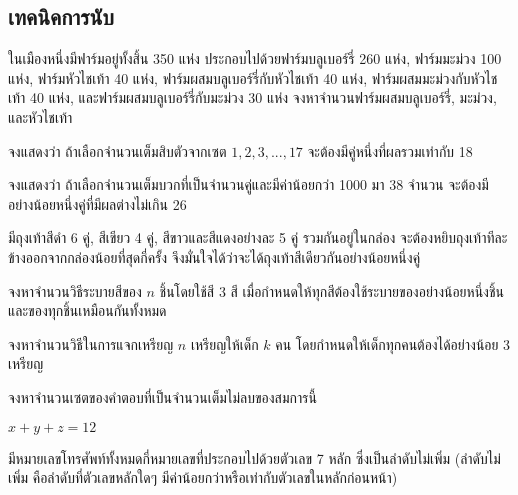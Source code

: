 \subsection*{เทคนิคการนับ}
\begin{exercise}
ในเมืองหนึ่งมีฟาร์มอยู่ทั้งสิ้น 350 แห่ง ประกอบไปด้วยฟาร์มบลูเบอร์รี่ 260 แห่ง, ฟาร์มมะม่วง 100 แห่ง, ฟาร์มหัวไชเท้า 40 แห่ง, ฟาร์มผสมบลูเบอร์รี่กับหัวไชเท้า 40 แห่ง, ฟาร์มผสมมะม่วงกับหัวไชเท้า 40 แห่ง, และฟาร์มผสมบลูเบอร์รี่กับมะม่วง 30 แห่ง จงหาจำนวนฟาร์มผสมบลูเบอร์รี่, มะม่วง, และหัวไชเท้า
\end{exercise}
\begin{exercise}
จงแสดงว่า ถ้าเลือกจำนวนเต็มสิบตัวจากเซต ${1,2,3,...,17}$ จะต้องมีคู่หนึ่งที่ผลรวมเท่ากับ 18
\end{exercise}
\begin{exercise}
จงแสดงว่า ถ้าเลือกจำนวนเต็มบวกที่เป็นจำนวนคู่และมีค่าน้อยกว่า 1000 มา 38 จำนวน จะต้องมีอย่างน้อยหนึ่งคู่ที่มีผลต่างไม่เกิน 26
\end{exercise}
\begin{exercise}
มีถุงเท้าสีดำ 6 คู่, สีเขียว 4 คู่, สีขาวและสีแดงอย่างละ 5 คู่ รวมกันอยู่ในกล่อง จะต้องหยิบถุงเท้าทีละข้างออกจากกล่องน้อยที่สุดกี่ครั้ง จึงมั่นใจได้ว่าจะได้ถุงเท้าสีเดียวกันอย่างน้อยหนึ่งคู่
\end{exercise}
\begin{exercise}
จงหาจำนวนวิธีระบายสีของ $n$ ชิ้นโดยใช้สี 3 สี เมื่อกำหนดให้ทุกสีต้องใช้ระบายของอย่างน้อยหนึ่งชิ้น และของทุกชิ้นเหมือนกันทั้งหมด
\end{exercise}
\begin{exercise}
จงหาจำนวนวิธีในการแจกเหรียญ $n$ เหรียญให้เด็ก $k$ คน โดยกำหนดให้เด็กทุกคนต้องได้อย่างน้อย 3 เหรียญ
\end{exercise}
\begin{exercise}
จงหาจำนวนเซตของคำตอบที่เป็นจำนวนเต็มไม่ลบของสมการนี้
\begin{center}
$x+y+z=12$
\end{center}
\end{exercise}
\begin{exercise}
มีหมายเลขโทรศัพท์ทั้งหมดกี่หมายเลขที่ประกอบไปด้วยตัวเลข 7 หลัก ซึ่งเป็นลำดับไม่เพิ่ม (ลำดับไม่เพิ่ม คือลำดับที่ตัวเลขหลักใดๆ มีค่าน้อยกว่าหรือเท่ากับตัวเลขในหลักก่อนหน้า)
\end{exercise}

